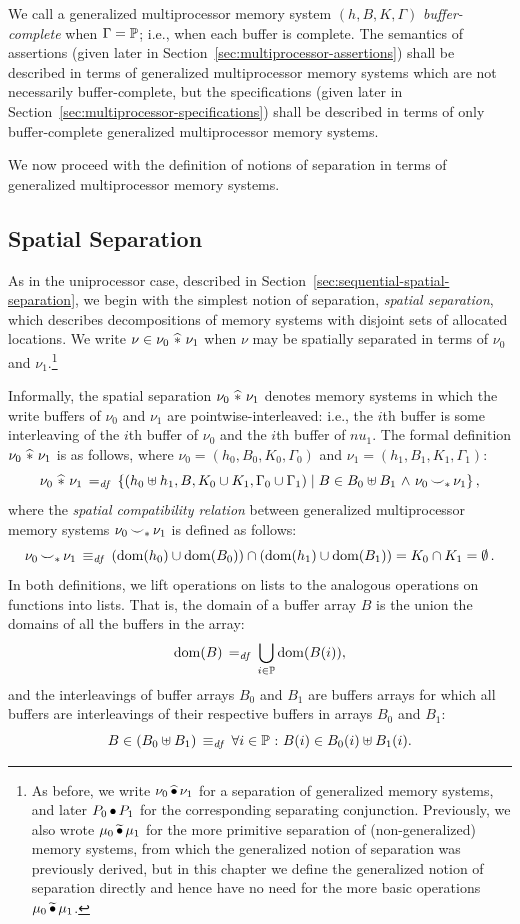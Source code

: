 \documentclass[11pt]{report}
\begin{document}
We call a generalized multiprocessor memory system $(h,B,K,\Gamma)$ \emph{buffer-complete} when $\Gamma = \mathbb{P}$; i.e., when each buffer is complete. The semantics of assertions (given later in Section~\ref{sec:multiprocessor-assertions}) shall be described in terms of generalized multiprocessor memory systems which are not necessarily buffer-complete, but the specifications (given later in Section~\ref{sec:multiprocessor-specifications}) shall be described in terms of only buffer-complete generalized multiprocessor memory systems.

We now proceed with the definition of notions of separation in terms of generalized multiprocessor memory systems. 

\subsection{Spatial Separation}
\label{sec:spatial-separation}

As in the uniprocessor case, described in Section~\ref{sec:sequential-spatial-separation}, we begin with the simplest notion of separation, \emph{spatial separation}, which describes decompositions of memory systems with disjoint sets of allocated locations. We write $\nu \in \nu_0 \operatorname{\,\widehat{\ast}\,} \nu_1$ when $\nu$ may be spatially separated in terms of $\nu_0$ and $\nu_1$.\footnote{As before, we write $\nu_0 \operatorname{\widehat{\bullet}} \nu_1$ for a separation of generalized memory systems, and later $P_0 \operatorname{\bullet} P_1$ for the corresponding separating conjunction. Previously, we also wrote $\mu_0 \operatorname{\widetilde{\bullet}} \mu_1$ for the more primitive separation of (non-generalized) memory systems, from which the generalized notion of separation was previously derived, but in this chapter we define the generalized notion of separation directly and hence have no need for the more basic operations $\mu_0 \operatorname{\widetilde{\bullet}} \mu_1$.} 

Informally, the spatial separation $\nu_0 \operatorname{\,\widehat{\ast}\,} \nu_1$ denotes memory systems in which the write buffers of $\nu_0$ and $\nu_1$ are pointwise-interleaved: i.e., the $i$th buffer is some interleaving of the $i$th buffer of $\nu_0$ and the $i$th buffer of $nu_1$. The formal definition $\nu_0 \operatorname{\,\widehat{\ast}\,} \nu_1$ is as follows, where $\nu_0 = (h_0,B_0,K_0,\Gamma_0)$ and $\nu_1 = (h_1,B_1,K_1,\Gamma_1)$: \[ \nu_0 \operatorname{\,\widehat{\ast}\,} \nu_1 \operatorname{\;=_{\mathit{df}}\;} \left\lbrace (h_0 \uplus h_1, B, K_0 \cup K_1, \Gamma_0 \cup \Gamma_1) \mid B \in B_0 \uplus B_1 \operatorname{\,\wedge\,} \nu_0 \operatorname{\smile}_\ast \nu_1 \right\rbrace,\] where the \emph{spatial compatibility relation} between generalized multiprocessor memory systems $\nu_0 \operatorname{\smile}_\ast \nu_1$ is defined as follows: \[ \nu_0 \operatorname{\smile}_\ast \nu_1 \operatorname{\;\equiv_{\mathit{df}}\;} \left(\operatorname{\mathrm{dom}}(h_0) \cup \operatorname{\mathrm{dom}}(B_0) \right) \cap \left( \operatorname{\mathrm{dom}}(h_1) \cup \operatorname{\mathrm{dom}}(B_1) \right) = K_0 \cap K_1 = \operatorname{\emptyset}.\] In both definitions, we lift operations on lists to the analogous operations on functions into lists. That is, the domain of a buffer array $B$ is the union the domains of all the buffers in the array:  \[ \operatorname{\mathrm{dom}}(B) \operatorname{\;=_{\mathit{df}}\;} \bigcup_{i \in \mathbb{P}} \operatorname{\mathrm{dom}}(B(i)),\] and the interleavings of buffer arrays $B_0$ and $B_1$ are buffers arrays for which all buffers are interleavings of their respective buffers in arrays $B_0$ and $B_1$: \[ B \in (B_0 \uplus B_1) \operatorname{\;\equiv_{\mathit{df}}\;} \forall i \in \mathbb{P} \operatorname{\,:\,} B(i) \in B_0(i) \uplus B_1(i).\]
\end{document}
